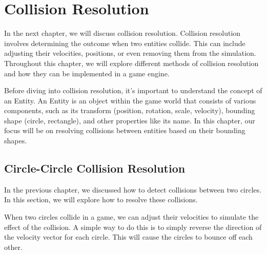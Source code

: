 \chapter{Collision Resolution}
In the next chapter, we will discuss collision resolution. Collision resolution
involves determining the outcome when two entities collide. This can include
adjusting their velocities, positions, or even removing them from the
simulation. Throughout this chapter, we will explore different methods of
collision resolution and how they can be implemented in a game engine.

Before diving into collision resolution, it's important to understand the
concept of an Entity. An Entity is an object within the game world that
consists of various components, such as its transform (position, rotation,
scale, velocity), bounding shape (circle, rectangle), and other properties like
its name. In this chapter, our focus will be on resolving collisions between
entities based on their bounding shapes.

\section{Circle-Circle Collision Resolution}
In the previous chapter, we discussed how to detect collisions between two
circles. In this section, we will explore how to resolve these collisions.

When two circles collide in a game, we can adjust their velocities to simulate
the effect of the collision. A simple way to do this is to simply reverse the
direction of the velocity vector for each circle. This will cause the circles
to bounce off each other.